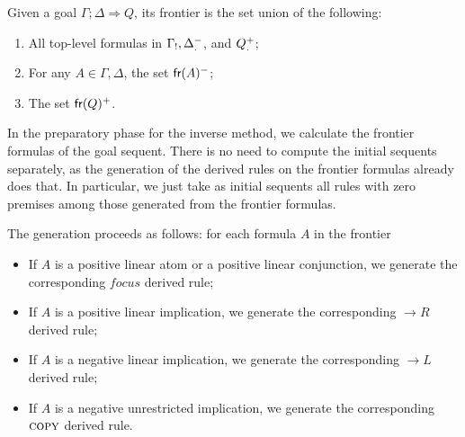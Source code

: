 \begin{definition}[Frontier]
  Given a goal $\Gamma;\Delta \Longrightarrow Q$, its frontier is the set union
  of the following:

  \begin{enumerate}
  \item All top-level formulas in $\Gamma_!,
    \Delta_.^-$, and $Q_.^+$;
  \item For any $A \in \Gamma, \Delta$, the set $\textsf{fr}(A)^-$;
  \item The set $\textsf{fr}(Q)^+$.
  \end{enumerate}
\end{definition}

In the preparatory phase for the inverse method, we calculate the frontier
formulas of the goal sequent. There is no need to compute the initial sequents
separately, as the generation of the derived rules on the frontier formulas
already does that. In particular, we just take as initial sequents all rules
with zero premises among those generated from the frontier formulas.

The generation proceeds as follows: for each formula $A$ in the frontier

\begin{itemize}
\item If $A$ is a positive linear atom or a positive linear conjunction, we
  generate the corresponding $focus$ derived rule;
\item If $A$ is a positive linear implication, we generate the corresponding
  $\rightarrow R$ derived rule;
\item If $A$ is a negative linear implication, we generate the corresponding
  $\rightarrow L$ derived rule;
\item If $A$ is a negative unrestricted implication, we generate the
  corresponding $\textsc{copy}$ derived rule.
\end{itemize}

